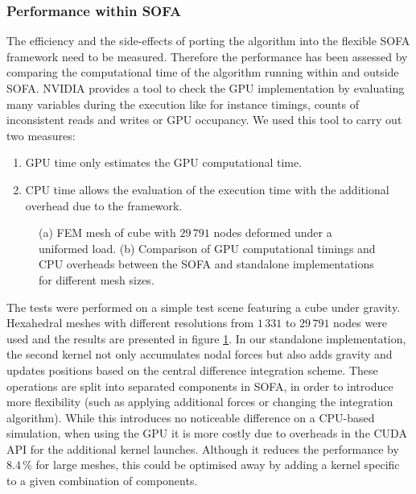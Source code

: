 		\subsubsection*{Performance within SOFA}
The efficiency and the side-effects of porting the algorithm into the flexible SOFA framework need to be measured. Therefore the performance has been assessed by comparing the computational time of the algorithm running within and outside SOFA. NVIDIA provides a tool to check the GPU implementation by evaluating many variables during the execution like for instance timings, counts of inconsistent reads and writes or GPU occupancy. We used this tool to carry out two measures:
\begin{enumerate}
\item GPU time only estimates the GPU computational time.
\item CPU time allows the evaluation of the execution time with the additional overhead due to the framework.
\end{enumerate}
%
\begin{figure}[ht]
\centering 
{}
\hspace{0.2cm}
\caption [Computational timings within SOFA] {(a) FEM mesh of cube with $29\,791$ nodes deformed under a uniformed load. (b) Comparison of GPU computational timings and CPU overheads between the SOFA and standalone implementations for different mesh sizes.}
\label{chap6:fig-cube_and_curves}
\end{figure}

The tests were performed on a simple test scene featuring a cube under gravity. Hexahedral meshes with different resolutions from $1\,331$ to $29\,791$ nodes were used and the results are presented in figure \ref{chap6:fig-cube_and_curves}. In our standalone implementation, the second kernel not only accumulates nodal forces but also adds gravity and updates positions based on the central difference integration scheme. These operations are split into separated components in SOFA, in order to introduce more flexibility (such as applying additional forces or changing the integration algorithm). While this introduces no noticeable difference on a CPU-based simulation, when using the GPU it is more costly due to overheads in the CUDA API for the additional kernel launches. Although it reduces the performance by $8.4\, \%$ for large meshes, this could be optimised away by adding a kernel specific to a given combination of components.
		
